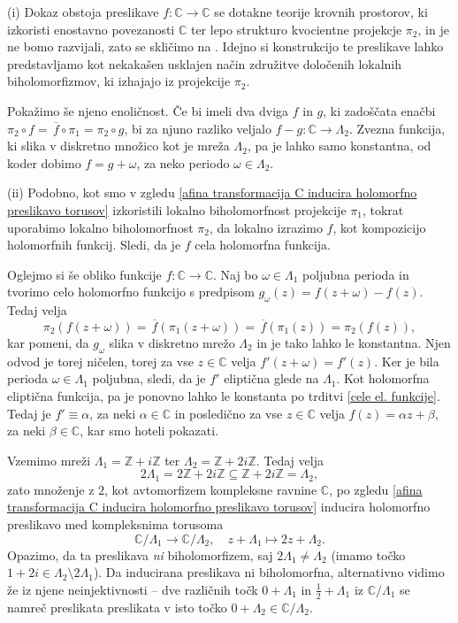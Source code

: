\documentclass[mat1]{fmfdelo}
\numberwithin{equation}{section}
\newcommand{\Z}{\mathbb Z}
\newcommand{\C}{\mathbb C}
\newcommand{\om}{\omega}
\newcommand{\olsi}[1]{\,\overline{\!{#1}}} %
\theoremstyle{definition}
\begin{document}
\begin{dokaz}
    (i) Dokaz obstoja preslikave $f : \C \to \C$ se dotakne teorije krovnih prostorov, ki izkoristi enostavno povezanosti $\C$ ter lepo strukturo kvocientne projekcje $\pi_2$, in je ne bomo razvijali, zato se skličimo na \cite[Lema 3.1]{Stevenhagen}. Idejno si konstrukcijo te preslikave lahko predstavljamo kot nekakašen usklajen način združitve določenih lokalnih biholomorfizmov, ki izhajajo iz projekcije $\pi_2$.

    Pokažimo še njeno enoličnost. Če bi imeli dva dviga $f$ in $g$, ki zadoščata enačbi $\pi_2 \circ f = \olsi{f} \circ \pi_1 = \pi_2 \circ g$, bi za njuno razliko veljalo $f - g : \C \to \Lambda_2$. Zvezna funkcija, ki slika v diskretno množico kot je mreža $\Lambda_2$, pa je lahko samo konstantna, od koder dobimo $f = g + \om$, za neko periodo $\om \in \Lambda_2$.

    (ii) Podobno, kot smo v zgledu \ref{afina transformacija C inducira holomorfno preslikavo torusov} izkoristili lokalno biholomorfnost projekcije $\pi_1$, tokrat uporabimo lokalno biholomorfnost $\pi_2$, da lokalno izrazimo $f$, kot kompozicijo holomorfnih funkcij. Sledi, da je $f$ cela holomorfna funkcija. 

    Oglejmo si še obliko funkcije $f : \C \to \C$. Naj bo $\om \in \Lambda_1$ poljubna perioda in tvorimo celo holomorfno funkcijo s predpisom $g_\om(z) = f(z + \om) - f(z)$. Tedaj velja
    \[
        \pi_2(f(z + \om)) = \olsi{f}(\pi_1(z + \om)) = 
        \olsi{f}(\pi_1(z)) = \pi_2(f(z)),
    \] 
    kar pomeni, da $g_\om$ slika v diskretno mrežo $\Lambda_2$ in je tako lahko le konstantna. Njen odvod je torej ničelen, torej za vse $z \in \C$ velja $f'(z + \om) = f'(z)$. Ker je bila perioda $\om \in \Lambda_1$ poljubna, sledi, da je $f'$ eliptična glede na $\Lambda_1$. Kot holomorfna eliptična funkcija, pa je ponovno lahko le konstanta po trditvi \ref{cele el. funkcije}. Tedaj je $f' \equiv \alpha$, za neki $\alpha \in \C$ in posledično za vse $z \in \C$ velja $f(z) = \alpha z + \beta$, za neki $\beta \in \C$, kar smo hoteli pokazati. 
\end{dokaz}

\begin{primer*}
    Vzemimo mreži $\Lambda_1 = \Z + i\Z$ ter $\Lambda_2 = \Z + 2i\Z$. Tedaj velja 
    \[
        2\Lambda_1 = 2\Z + 2i\Z \subseteq \Z + 2i\Z = \Lambda_2, 
    \]
    zato množenje z $2$, kot avtomorfizem kompleksne ravnine $\C$, po zgledu \ref{afina transformacija C inducira holomorfno preslikavo torusov} inducira holomorfno preslikavo med kompleksnima torusoma
    \[
        \C/\Lambda_1 \to \C/\Lambda_2, \quad z + \Lambda_1 \mapsto 2z + \Lambda_2.
    \]
    Opazimo, da ta preslikava \emph{ni} biholomorfizem, saj $2\Lambda_1 \neq \Lambda_2$ (imamo točko $1 + 2i \in \Lambda_2 \setminus 2\Lambda_1$). Da inducirana preslikava ni biholomorfna, alternativno vidimo že iz njene neinjektivnosti -- dve različnih točk $0 + \Lambda_1$ in $\frac12 + \Lambda_1$ iz $\C/\Lambda_1$ se namreč preslikata preslikata v isto točko $0 + \Lambda_2 \in \C/\Lambda_2$.  
    
\end{primer*}
\end{document}
